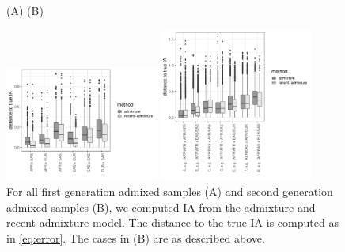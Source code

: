 \documentclass[12pt]{article}
\theoremstyle{definition}
\begin{document}
\begin{figure}[htb]
  \hspace{3cm} (A) \hspace{8cm} (B)
  \begin{center}
    \parbox[b]{0.45\textwidth}{\includegraphics[width=0.45\textwidth]{deviations_mixed_EUROFORGEN.pdf}\vspace{2cm}}
    \hspace{1cm}
    \parbox[b]{0.45\textwidth}{\includegraphics[width=0.45\textwidth]{deviations_mixed_cases_EUROFORGEN.pdf}}
  \end{center}
  \caption{\label{fig:mixed_cases_EUROFORGEN} For all first generation
    admixed samples (A) and second generation admixed samples (B), we
    computed IA from the admixture and recent-admixture model. The
    distance to the true IA is computed as in \eqref{eq:error}. The
    cases in (B) are as described above. }
\end{figure}
\end{document}
